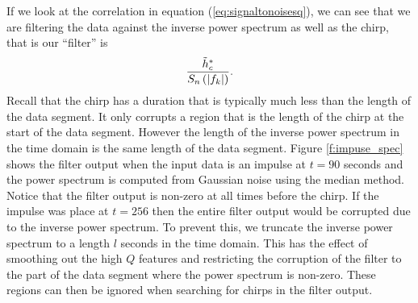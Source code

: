 If we look at the correlation in equation (\ref{eq:signaltonoisesq}), we can
see that we are filtering the data against the inverse power
spectrum as well as the chirp, that is our ``filter'' is
\begin{equation}
\frac{\tilde{h}_c^\ast}{S_n\left(\left|f_{k}\right|\right)}.
\end{equation}
Recall that the chirp has a duration that is typically much less than the
length of the data segment. It only corrupts a region that is the length of
the chirp at the start of the data segment. However the length of the 
inverse power spectrum in the time domain is the same length of the data
segment. Figure \ref{f:impuse_spec} shows the filter output when the input
data is an impulse at $t=90$ seconds and the power spectrum is computed from
Gaussian noise using the median method. Notice that the filter output is
non-zero at all times before the chirp. If the impulse was place at $t=256$
then the entire filter output would be corrupted due to the inverse power
spectrum.  To prevent this, we truncate the inverse power spectrum to a
length $l$ seconds in the time domain. This has the effect of smoothing out the
high $Q$ features and restricting the corruption of the filter to the part of
the data segment where the power spectrum is non-zero. These regions can then
be ignored when searching for chirps in the filter output.

